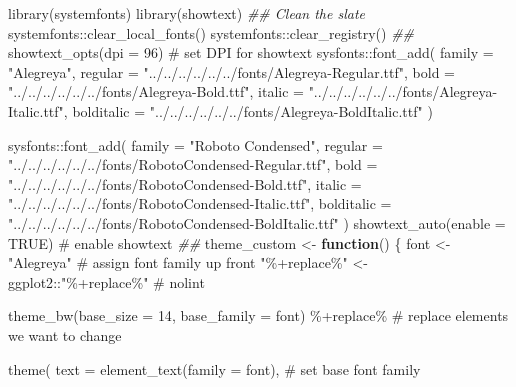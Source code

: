 \documentclass[
  letterpaper,
  DIV=11,
  numbers=noendperiod]{scrartcl}
\newenvironment{Shaded}{\begin{snugshade}}{\end{snugshade}}
\newcommand{\AttributeTok}[1]{\textcolor[rgb]{0.40,0.45,0.13}{#1}}
\newcommand{\CommentTok}[1]{\textcolor[rgb]{0.37,0.37,0.37}{#1}}
\newcommand{\ConstantTok}[1]{\textcolor[rgb]{0.56,0.35,0.01}{#1}}
\newcommand{\ControlFlowTok}[1]{\textcolor[rgb]{0.00,0.23,0.31}{\textbf{#1}}}
\newcommand{\DecValTok}[1]{\textcolor[rgb]{0.68,0.00,0.00}{#1}}
\newcommand{\DocumentationTok}[1]{\textcolor[rgb]{0.37,0.37,0.37}{\textit{#1}}}
\newcommand{\FunctionTok}[1]{\textcolor[rgb]{0.28,0.35,0.67}{#1}}
\newcommand{\NormalTok}[1]{\textcolor[rgb]{0.00,0.23,0.31}{#1}}
\newcommand{\OtherTok}[1]{\textcolor[rgb]{0.00,0.23,0.31}{#1}}
\newcommand{\SpecialCharTok}[1]{\textcolor[rgb]{0.37,0.37,0.37}{#1}}
\newcommand{\StringTok}[1]{\textcolor[rgb]{0.13,0.47,0.30}{#1}}
\begin{document}
\begin{Shaded}
\begin{Highlighting}[]
\FunctionTok{library}\NormalTok{(systemfonts)}
\FunctionTok{library}\NormalTok{(showtext)}
\DocumentationTok{\#\# Clean the slate}
\NormalTok{systemfonts}\SpecialCharTok{::}\FunctionTok{clear\_local\_fonts}\NormalTok{()}
\NormalTok{systemfonts}\SpecialCharTok{::}\FunctionTok{clear\_registry}\NormalTok{()}
\DocumentationTok{\#\#}
\FunctionTok{showtext\_opts}\NormalTok{(}\AttributeTok{dpi =} \DecValTok{96}\NormalTok{) }\CommentTok{\# set DPI for showtext}
\NormalTok{sysfonts}\SpecialCharTok{::}\FunctionTok{font\_add}\NormalTok{(}
  \AttributeTok{family =} \StringTok{"Alegreya"}\NormalTok{,}
  \AttributeTok{regular =} \StringTok{"../../../../../../fonts/Alegreya{-}Regular.ttf"}\NormalTok{,}
  \AttributeTok{bold =} \StringTok{"../../../../../../fonts/Alegreya{-}Bold.ttf"}\NormalTok{,}
  \AttributeTok{italic =} \StringTok{"../../../../../../fonts/Alegreya{-}Italic.ttf"}\NormalTok{,}
  \AttributeTok{bolditalic =} \StringTok{"../../../../../../fonts/Alegreya{-}BoldItalic.ttf"}
\NormalTok{)}

\NormalTok{sysfonts}\SpecialCharTok{::}\FunctionTok{font\_add}\NormalTok{(}
  \AttributeTok{family =} \StringTok{"Roboto Condensed"}\NormalTok{,}
  \AttributeTok{regular =} \StringTok{"../../../../../../fonts/RobotoCondensed{-}Regular.ttf"}\NormalTok{,}
  \AttributeTok{bold =} \StringTok{"../../../../../../fonts/RobotoCondensed{-}Bold.ttf"}\NormalTok{,}
  \AttributeTok{italic =} \StringTok{"../../../../../../fonts/RobotoCondensed{-}Italic.ttf"}\NormalTok{,}
  \AttributeTok{bolditalic =} \StringTok{"../../../../../../fonts/RobotoCondensed{-}BoldItalic.ttf"}
\NormalTok{)}
\FunctionTok{showtext\_auto}\NormalTok{(}\AttributeTok{enable =} \ConstantTok{TRUE}\NormalTok{) }\CommentTok{\# enable showtext}
\DocumentationTok{\#\#}
\NormalTok{theme\_custom }\OtherTok{\textless{}{-}} \ControlFlowTok{function}\NormalTok{() \{}
\NormalTok{  font }\OtherTok{\textless{}{-}} \StringTok{"Alegreya"} \CommentTok{\# assign font family up front}
  \StringTok{"\%+replace\%"} \OtherTok{\textless{}{-}}\NormalTok{ ggplot2}\SpecialCharTok{::}\StringTok{"\%+replace\%"} \CommentTok{\# nolint}

  \FunctionTok{theme\_bw}\NormalTok{(}\AttributeTok{base\_size =} \DecValTok{14}\NormalTok{, }\AttributeTok{base\_family =}\NormalTok{ font) }\SpecialCharTok{\%+replace\%} \CommentTok{\# replace elements we want to change}

    \FunctionTok{theme}\NormalTok{(}
      \AttributeTok{text =} \FunctionTok{element\_text}\NormalTok{(}\AttributeTok{family =}\NormalTok{ font), }\CommentTok{\# set base font family}


\end{Highlighting}
\end{Shaded}
\end{document}

